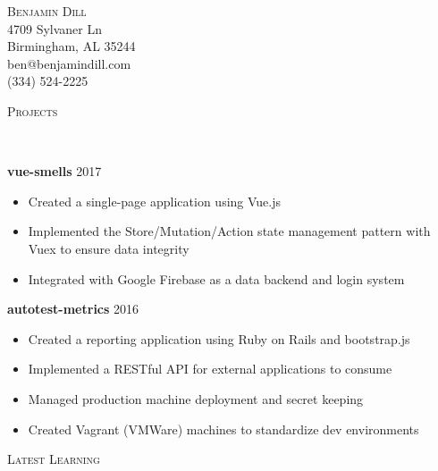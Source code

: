 \documentclass[9pt]{article}
\newenvironment{changemargin}[2]{%
  \begin{list}{}{%
    \setlength{\topsep}{0pt}%
    \setlength{\leftmargin}{#1}%
    \setlength{\rightmargin}{#2}%
    \setlength{\listparindent}{\parindent}%
    \setlength{\itemindent}{\parindent}%
    \setlength{\parsep}{\parskip}%
  }%
  \item[]}{\end{list}
}
\newcommand{\lineover}{
	\begin{changemargin}{-0.05in}{-0.05in}
		\vspace*{-8pt}
		\hrulefill \\
		\vspace*{-2pt}
	\end{changemargin}
}
\newcommand{\header}[1]{
	\begin{changemargin}{-0.5in}{-0.5in}
		\scshape{#1}\\
  	\lineover
	\end{changemargin}
}
\newcommand{\contact}[5]{
	\begin{changemargin}{-0.5in}{-0.5in}
		\begin{center}
			{\Large \scshape {#1}}\\ \smallskip
			{#2}\\ \smallskip 
			{#3}\\ \smallskip
			{#4}\\ \smallskip
			{#5}\smallskip
		\end{center}
	\end{changemargin}
}
\newenvironment{body} {
	\vspace*{-16pt}
	\begin{changemargin}{-0.25in}{-0.5in}
  }	
	{\end{changemargin}
}
\begin{document}
\contact{Benjamin Dill}{4709 Sylvaner Ln}{Birmingham, AL 35244}{ben@benjamindill.com}{(334) 524-2225}


%
%

\header{Projects}

\begin{body}
	\vspace{17pt}
	\textbf{vue-smells}  \hfill{} 2017
	\begin{itemize}
		\item{Created a single-page application using Vue.js}
		\item{Implemented the Store/Mutation/Action state management pattern with Vuex to ensure data integrity}
		\item{Integrated with Google Firebase as a data backend and login system}
	\end{itemize}
\end{body}

\begin{body}
    \vspace{17pt}
    \textbf{autotest-metrics} \hfill{} 2016
    \begin{itemize}
        \item{Created a reporting application using Ruby on Rails and bootstrap.js}
        \item{Implemented a RESTful API for external applications to consume}
        \item{Managed production machine deployment and secret keeping}
        \item{Created Vagrant (VMWare) machines to standardize dev environments}
    \end{itemize}
\end{body}


\header{Latest Learning}
\end{document}
